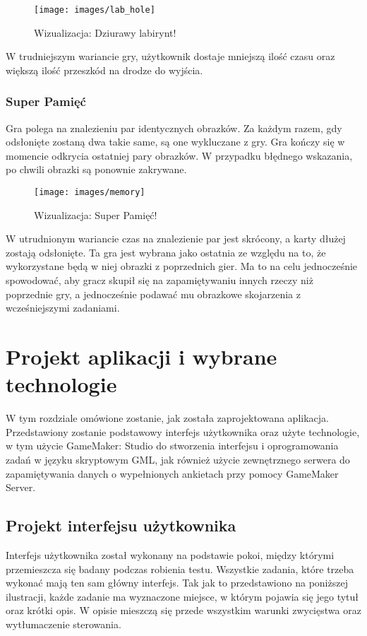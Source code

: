 \documentclass[openright]{xmgr}
\begin{document}
\begin{figure}[h]
\centering
\texttt{[image: images/lab\_hole]}
\caption{Wizualizacja: Dziurawy labirynt!}
\label{fig:lab_hole}
\end{figure}

W trudniejszym wariancie gry, użytkownik dostaje mniejszą ilość czasu
oraz większą ilość przeszkód na drodze do wyjścia.  

\subsection{Super Pamięć}
Gra polega na znalezieniu par identycznych obrazków. Za każdym razem,
gdy odsłonięte zostaną dwa takie same, są one wykluczane z gry. Gra kończy się
w momencie odkrycia ostatniej pary obrazków. W przypadku błędnego wskazania, po chwili obrazki są ponownie zakrywane.

\begin{figure}[h]
\centering
\texttt{[image: images/memory]}
\caption{Wizualizacja: Super Pamięć!}
\label{fig:memory}
\end{figure}

W utrudnionym wariancie czas na znalezienie par jest skrócony, a karty dłużej zostają odsłonięte.
Ta gra jest wybrana jako ostatnia ze względu na to, że wykorzystane będą w niej obrazki z poprzednich gier. Ma to na celu jednocześnie spowodować, aby gracz skupił się na zapamiętywaniu innych rzeczy niż poprzednie gry, a jednocześnie podawać mu obrazkowe skojarzenia z wcześniejszymi zadaniami. 

\chapter{Projekt aplikacji i wybrane technologie}
W tym rozdziale omówione zostanie, jak została zaprojektowana aplikacja.
Przedstawiony zostanie podstawowy interfejs użytkownika oraz użyte technologie, w tym użycie GameMaker: Studio do stworzenia interfejsu i oprogramowania zadań w języku skryptowym GML, jak również użycie zewnętrznego serwera do zapamiętywania danych o wypełnionych ankietach przy pomocy GameMaker Server.

\section{Projekt interfejsu użytkownika}
Interfejs użytkownika został wykonany na podstawie pokoi, między którymi
przemieszcza się badany podczas robienia testu. Wszystkie zadania, które
trzeba wykonać mają ten sam główny interfejs. Tak jak to przedstawiono
na poniższej ilustracji, każde zadanie ma wyznaczone miejsce, w którym
pojawia się jego tytuł oraz krótki opis. W opisie mieszczą się przede
wszystkim warunki zwycięstwa oraz wytłumaczenie sterowania.
\end{document}
